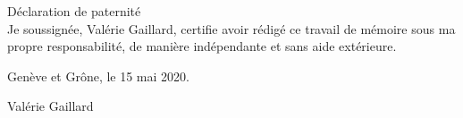 
\begin{titlepage}
 \begin{center}
    \Large
    Déclaration de paternité\\





 Je soussignée, Valérie Gaillard, certifie avoir rédigé ce travail de mémoire sous ma propre responsabilité, de manière indépendante et sans aide extérieure.




 \vfill

 Genève et Grône, le 15 mai 2020.


 Valérie Gaillard




	 \hfill \\
	 \rule{0mm}{0.5pt} \hfill
 \end{center}
\end{titlepage}
